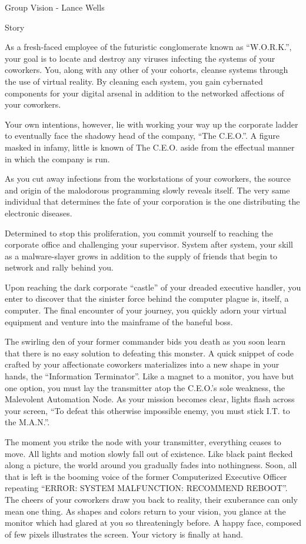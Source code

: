 \documentclass[12pt]{report}
\begin{document}
\begin{section}{Group Vision - Lance Wells}
\begin{subsection}{Story}

As a fresh-faced employee of the futuristic conglomerate known as
``W.O.R.K.'', your goal is to locate and destroy any viruses infecting the
systems of your coworkers. You, along with any other of your cohorts,
cleanse systems through the use of virtual reality. By cleaning each system,
you gain cybernated components for your digital arsenal in addition to 
the networked affections of your coworkers.

Your own intentions, however, lie with working your way up the corporate
ladder to eventually face the shadowy head of the company, ``The C.E.O.''.
A figure masked in infamy, little is known of The C.E.O. aside from the
effectual manner in which the company is run.

As you cut away infections from the workstations of your coworkers, the
source and origin of the malodorous programming slowly reveals itself. The
very same individual that determines the fate of your corporation is the one
distributing the electronic diseases.

Determined to stop this proliferation, you commit yourself to reaching the
corporate office and challenging your supervisor. System after system, your
skill as a malware-slayer grows in addition to the supply of friends that
begin to network and rally behind you.

Upon reaching the dark corporate ``castle'' of your dreaded executive
handler, you enter to discover that the sinister force behind the computer
plague is, itself, a computer. The final encounter of your journey, you
quickly adorn your virtual equipment and venture into the mainframe of the
baneful boss.

The swirling den of your former commander bids you death as you soon learn
that there is no easy solution to defeating this monster. A quick snippet of
code crafted by your affectionate coworkers materializes into a new shape
in your hands, the ``Information Terminator''. Like a magnet to a monitor,
you have but one option, you must lay the transmitter atop the C.E.O.'s 
sole weakness, the Malevolent Automation Node. As your mission becomes
clear, lights flash across your screen, ``To defeat this otherwise
impossible enemy, you must stick I.T. to the M.A.N.''.

The moment you strike the node with your transmitter, everything ceases to
move. All lights and motion slowly fall out of existence. Like black paint
flecked along a picture, the world around you gradually fades into
nothingness. Soon, all that is left is the booming voice of the former 
Computerized Executive Officer repeating ``ERROR: SYSTEM MALFUNCTION:
RECOMMEND REBOOT''. The cheers of your coworkers draw you back to reality,
their exuberance can only mean one thing. As shapes and colors return to
your vision, you glance at the monitor which had glared at you so
threateningly before. A happy face, composed of few pixels illustrates the
screen. Your victory is finally at hand.
\end{subsection}


\end{section}
\end{document}
